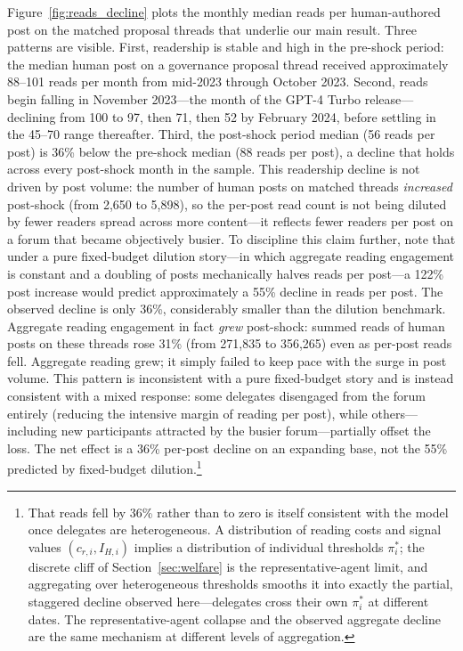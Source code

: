 \documentclass[12pt]{article}
\begin{document}
Figure~\ref{fig:reads_decline} plots the monthly median reads per human-authored
post on the matched proposal threads that underlie our main result.
Three patterns are visible. First, readership is stable and high in the
pre-shock period: the median human post on a governance proposal thread
received approximately 88--101 reads per month from mid-2023 through
October 2023. Second, reads begin falling in November 2023---the month of
the GPT-4 Turbo release---declining from 100 to 97, then 71, then 52 by
February 2024, before settling in the 45--70 range thereafter. Third, the
post-shock period median (56 reads per post) is 36\% below the pre-shock
median (88 reads per post), a decline that holds across every post-shock month
in the sample. This readership decline is not driven by post volume: the number
of human posts on matched threads \emph{increased} post-shock (from 2,650 to
5,898), so the per-post read count is not being diluted by fewer readers spread
across more content---it reflects fewer readers per post on a forum that
became objectively busier. To discipline this claim further, note that under
a pure fixed-budget dilution story---in which aggregate reading engagement is
constant and a doubling of posts mechanically halves reads per post---a 122\%
post increase would predict approximately a 55\% decline in reads per post.
The observed decline is only 36\%, considerably smaller than the dilution
benchmark. Aggregate reading engagement in fact \emph{grew}
post-shock: summed reads of human posts on these threads rose 31\% (from 271{,}835
to 356{,}265) even as per-post reads fell. Aggregate reading
grew; it simply failed to keep pace with the surge in post volume. This pattern
is inconsistent with a pure fixed-budget story and is instead consistent with
a mixed response: some delegates disengaged from the forum entirely
(reducing the intensive margin of reading per post), while others---including
new participants attracted by the busier forum---partially offset the loss.
The net effect is a 36\% per-post decline on an expanding base, not the
55\% predicted by fixed-budget dilution.\footnote{That reads fell by 36\% rather
than to zero is itself consistent with the model once delegates are heterogeneous.
A distribution of reading costs and signal values $(c_{r,i}, I_{H,i})$ implies a
distribution of individual thresholds $\pi^*_i$; the discrete cliff of
Section~\ref{sec:welfare} is the representative-agent limit, and aggregating over
heterogeneous thresholds smooths it into exactly the partial, staggered decline
observed here---delegates cross their own $\pi^*_i$ at different dates. The
representative-agent collapse and the observed aggregate decline are the same
mechanism at different levels of aggregation.}
\end{document}
